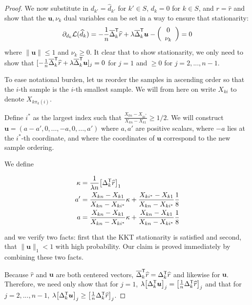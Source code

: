 \begin{proof}
We now substitute in $d_{k'} = \hat{d}_{k'}$ for $k' \in S$, $d_k = 0$ for $k \in S$, and $r = \hat{r}$ and show that the $\mathbf{u}, \nu_k$ dual variables can be set in a way to ensure that stationarity:
\begin{align*}
\partial_{d_k} \mathcal{L}(\widehat{d}_k) = -\frac{1}{n} \overline{\Delta}_k^{\mathsf{T}}\widehat{r} + \lambda \overline{\Delta}_k^{\mathsf{T}} \mbox{\boldmath $u$}
           - \left( \begin{array}{c} 0 \\ \nu_k \end{array} \right) = 0 
\end{align*}
where $\| \mathbf{u} \| \leq 1$ and $\nu_k \geq 0$. It clear that to show stationarity, we only need to show that $[-\frac{1}{n} \overline{\Delta}_k^{\mathsf{T}} \widehat{r} + \lambda \overline{\Delta}_k^{\mathsf{T}} \mbox{\boldmath $u$}]_j = 0$ for $j=1$ and $\geq 0$ for $j=2,...,n-1$.

To ease notational burden, let us reorder the samples in ascending order so that the $i$-th sample is the $i$-th smallest sample. We will from here on write $X_{ki}$ to denote $X_{k \pi_k(i)}$.

Define $i^*$ as the largest index such that $\frac{X_{kn} - X_{ki^*}}{X_{kn} - X_{k1}} \geq 1/2$. 
We will construct $\mathbf{u} = (a - a', 0, ..., -a, 0,..., a')$ where
$a,a'$ are positive scalars, where $-a$ lies at the $i^*$-th coordinate, and where the coordinates of $\mathbf{u}$ correspond
to the new sample ordering. 

We define

\begin{align*}
\kappa &= \frac{1}{\lambda n} \big[ \Delta_k^{\mathsf{T}} \widehat{r} \big]_1 \\
a' &= \frac{X_{kn} - X_{k1}}{X_{kn} -  X_{ki^*}} \kappa + 
     \frac{X_{ki^*}-X_{k1}}{X_{kn} - X_{k i^*}} \frac{1}{8} \\
a &= \frac{X_{kn} - X_{k1}}{X_{kn} -  X_{ki^*}} \kappa + 
     \frac{X_{kn}-X_{k1}}{X_{kn} - X_{ki^*}} \frac{1}{8} \\
\end{align*}

and we verify two facts: first that the KKT stationarity is satisfied and second, that $\| \mathbf{u} \|_1 < 1$ with high probability. Our claim is proved immediately by combining these two facts.

Because $\hat{r}$ and $\mathbf{u}$ are both centered vectors, $\overline{\Delta}_k^{\mathsf{T}} \widehat{r} = \Delta_k^{\mathsf{T}} \widehat{r}$ and likewise for $\mathbf{u}$. Therefore, we need only show that for $j=1$, $\lambda \big[ \Delta_k^{\mathsf{T}} \mbox{\boldmath $u$} \big]_j = \big[ \frac{1}{n} \Delta_k^{\mathsf{T}} \widehat{r} \big]_j$ and that for $j = 2,..., n-1$, $\lambda \big[ \Delta_k^{\mathsf{T}} \mbox{\boldmath $u$} \big]_j \geq \big[ \frac{1}{n} \Delta_k^{\mathsf{T}} \widehat{r} \big]_j$.


\end{proof}
